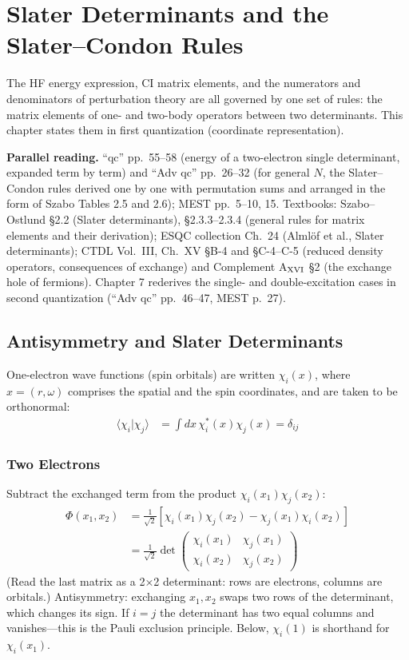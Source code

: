 \chapter{Slater Determinants and the Slater--Condon Rules}
\label{ch:slater}

The HF energy expression, CI matrix elements, and the numerators and denominators of perturbation theory are all governed by one set of rules: the matrix elements of one- and two-body operators between two determinants. This chapter states them in first quantization (coordinate representation).

\textbf{Parallel reading.} “qc” pp.~55--58 (energy of a two-electron single determinant, expanded term by term) and “Adv qc” pp.~26--32 (for general $N$, the Slater--Condon rules derived one by one with permutation sums and arranged in the form of Szabo Tables 2.5 and 2.6); MEST pp.~5--10, 15. Textbooks: Szabo--Ostlund §2.2 (Slater determinants), §2.3.3--2.3.4 (general rules for matrix elements and their derivation); ESQC collection Ch.~24 (Almlöf et al., Slater determinants); CTDL Vol.~III, Ch.~XV §B-4 and §C-4--C-5 (reduced density operators, consequences of exchange) and Complement A$_{\rm XVI}$ §2 (the exchange hole of fermions). Chapter 7 rederives the single- and double-excitation cases in second quantization (“Adv qc” pp.~46--47, MEST p.~27).

\section{Antisymmetry and Slater Determinants}

One-electron wave functions (spin orbitals) are written $\chi_{i}(x)$, where $x = (r, \omega)$ comprises the spatial and the spin coordinates, and are taken to be orthonormal:
\begin{align*}
\langle \chi_i|\chi_j\rangle &= \int dx \, \chi_i^*(x) \chi_j(x) = \delta_{ij}
\end{align*}

\subsection{Two Electrons}

Subtract the exchanged term from the product $\chi_i(x_1) \chi_j(x_2)$:
\begin{align*}
\Phi(x_1, x_2) &= \frac{1}{\sqrt{2}} [\chi_i(x_1) \chi_j(x_2) - \chi_j(x_1) \chi_i(x_2)] \\
&= \frac{1}{\sqrt{2}} \det\begin{pmatrix} \chi_i(x_1) & \chi_j(x_1) \\ \chi_i(x_2) & \chi_j(x_2) \end{pmatrix}
\end{align*}
(Read the last matrix as a 2×2 determinant: rows are electrons, columns are orbitals.) Antisymmetry: exchanging $x_1, x_2$ swaps two rows of the determinant, which changes its sign. If $i = j$ the determinant has two equal columns and vanishes---this is the Pauli exclusion principle. Below, $\chi_i(1)$ is shorthand for $\chi_i(x_1)$.

